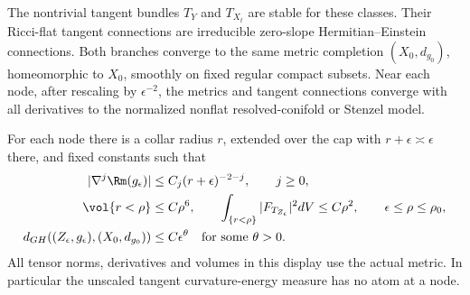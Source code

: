 \begin{proposition}\label{prop:tangent-metrics}
The nontrivial tangent bundles $T_Y$ and $T_{X_t}$ are stable for these
classes. Their Ricci-flat tangent connections are irreducible zero-slope
Hermitian--Einstein connections. Both branches converge to the same
metric completion $(X_0,d_{g_0})$, homeomorphic to $X_0$, smoothly on
fixed regular compact subsets. Near each node, after rescaling by
$\epsilon^{-2}$, the metrics and tangent connections converge with all
derivatives to the normalized nonflat resolved-conifold or Stenzel
model.

For each node there is a collar radius $r$, extended over the cap with
$r+\epsilon\asymp\epsilon$ there, and fixed constants such that
\begin{equation}\label{eq:tangent-bounds}
 \begin{aligned}
 |\nabla^j\Rm(g_\epsilon)|&\le C_j(r+\epsilon)^{-2-j},\qquad j\ge0,\\
 \vol\{r<\rho\}&\le C\rho^6,\qquad
 \int_{\{r<\rho\}}|F_{T_{Z_\epsilon}}|^2dV\le C\rho^2,
 \qquad \epsilon\le\rho\le\rho_0,\\
 d_{GH}((Z_\epsilon,g_\epsilon),(X_0,d_{g_0}))&\le C\epsilon^\theta
 \quad\text{for some }\theta>0.
 \end{aligned}
\end{equation}
All tensor norms, derivatives and volumes in this display use the actual
metric. In particular the unscaled tangent curvature-energy measure has
no atom at a node.
\end{proposition}

